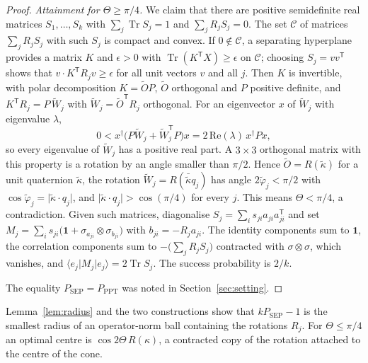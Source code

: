 \documentclass[11pt,a4paper]{article}
\theoremstyle{definition}
\theoremstyle{plain}
\DeclareMathOperator{\Tr}{Tr}
\newcommand{\ket}[1]{\lvert#1\rangle}
\newcommand{\bra}[1]{\langle#1\rvert}
\newcommand{\one}{\mathbf{1}}
\newcommand{\T}{\mathsf{T}}
\newcommand{\Psep}{P_{\mathrm{SEP}}}
\newcommand{\Pppt}{P_{\mathrm{PPT}}}
\begin{document}
\begin{proof}
\emph{Attainment for $\Theta\ge\pi/4$.} We claim that there are positive
semidefinite real matrices $S_1,\dots,S_k$ with $\sum_j\Tr S_j=1$ and
$\sum_jR_jS_j=0$. The set $\mathcal C$ of matrices $\sum_jR_jS_j$ with such
$S_j$ is compact and convex. If $0\notin\mathcal C$, a separating hyperplane
provides a matrix $K$ and $\epsilon>0$ with $\Tr(K^\T X)\ge\epsilon$ on
$\mathcal C$; choosing $S_j=vv^\T$ shows that $v\cdot K^\T R_jv\ge\epsilon$
for all unit vectors $v$ and all $j$. Then $K$ is invertible, with polar
decomposition $K=\tilde OP$, $\tilde O$ orthogonal and $P$ positive definite,
and $K^\T R_j=P\,\tilde W_j$ with $\tilde W_j=\tilde O^\T R_j$ orthogonal. For
an eigenvector $x$ of $\tilde W_j$ with eigenvalue $\lambda$,
\[
0<x^\dagger\bigl(P\tilde W_j+\tilde W_j^\T P\bigr)x=2\,\mathrm{Re}(\lambda)\,x^\dagger Px ,
\]
so every eigenvalue of $\tilde W_j$ has a positive real part. A $3\times3$
orthogonal matrix with this property is a rotation by an angle smaller than
$\pi/2$. Hence $\tilde O=R(\tilde\kappa)$ for a unit quaternion
$\tilde\kappa$, the rotation $\tilde W_j=R(\bar{\tilde\kappa}q_j)$ has angle
$2\tilde\varphi_j<\pi/2$ with
$\cos\tilde\varphi_j=\lvert\tilde\kappa\cdot q_j\rvert$, and
$\lvert\tilde\kappa\cdot q_j\rvert>\cos(\pi/4)$ for every $j$. This means
$\Theta<\pi/4$, a contradiction. Given such matrices, diagonalise
$S_j=\sum_is_{ji}a_{ji}a_{ji}^\T$ and set
$M_j=\sum_is_{ji}\bigl(\one+\sigma_{a_{ji}}\otimes\sigma_{b_{ji}}\bigr)$ with
$b_{ji}=-R_ja_{ji}$. The identity components sum to $\one$, the correlation
components sum to $-\bigl(\sum_jR_jS_j\bigr)$ contracted with
$\sigma\otimes\sigma$, which vanishes, and
$\bra{e_j}M_j\ket{e_j}=2\Tr S_j$. The success probability is $2/k$.

The equality $\Psep=\Pppt$ was noted in Section~\ref{sec:setting}.
\end{proof}

Lemma~\ref{lem:radius} and the two constructions show that $k\Psep-1$ is the
smallest radius of an operator-norm ball containing the rotations $R_j$. For
$\Theta\le\pi/4$ an optimal centre is $\cos2\Theta\,R(\kappa)$, a contracted
copy of the rotation attached to the centre of the cone.
\end{document}

